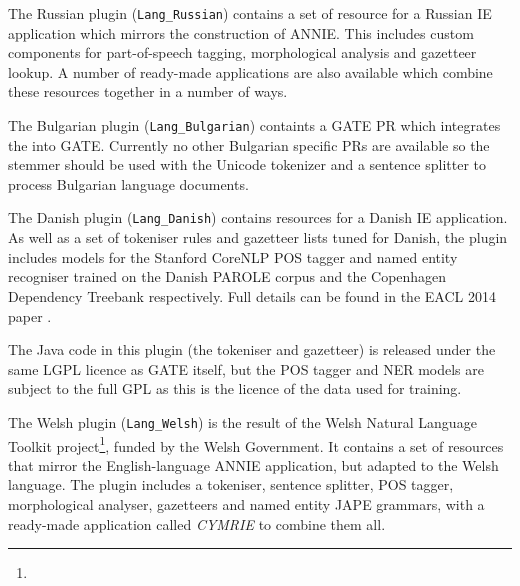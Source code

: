
The Russian plugin (\verb|Lang_Russian|) contains a set of resource for a Russian
IE application which mirrors the construction of ANNIE. This includes custom
components for part-of-speech tagging, morphological analysis and gazetteer
lookup. A number of ready-made applications are also available which combine
these resources together in a number of ways.

The Bulgarian plugin (\verb|Lang_Bulgarian|) containts a GATE PR which 
integrates the 
into GATE. Currently no other Bulgarian specific PRs are available so
the stemmer should be used with the Unicode tokenizer and a sentence splitter
to process Bulgarian language documents.

The Danish plugin (\verb|Lang_Danish|) contains resources for a Danish IE
application. As well as a set of tokeniser rules and gazetteer lists tuned for
Danish, the plugin includes models for the Stanford CoreNLP POS tagger and
named entity recogniser trained on the Danish PAROLE corpus and the Copenhagen
Dependency Treebank respectively.  Full details can be found in the EACL 2014
paper \cite{Derczynski2014d}.

The Java code in this plugin (the tokeniser and gazetteer) is released under
the same LGPL licence as GATE itself, but the POS tagger and NER models are
subject to the full GPL as this is the licence of the data used for training.

The Welsh plugin (\verb|Lang_Welsh|) is the result of the Welsh Natural
Language Toolkit
project\footnote{},
funded by the Welsh Government.  It contains a set of resources that mirror the
English-language ANNIE application, but adapted to the Welsh language.  The
plugin includes a tokeniser, sentence splitter, POS tagger, morphological
analyser, gazetteers and named entity JAPE grammars, with a ready-made
application called \emph{CYMRIE} to combine them all.
